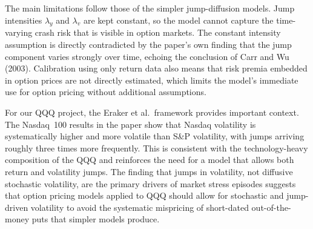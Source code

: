 \documentclass[12pt]{article}
\begin{document}
The main limitations follow those of the simpler jump-diffusion models. Jump
intensities $\lambda_y$ and $\lambda_v$ are kept constant, so the model cannot
capture the time-varying crash risk that is visible in option markets. The constant
intensity assumption is directly contradicted by the paper's own finding that the
jump component varies strongly over time, echoing the conclusion of Carr and Wu
(2003). Calibration using only return data also means that risk premia embedded
in option prices are not directly estimated, which limits the model's immediate
use for option pricing without additional assumptions.

For our QQQ project, the Eraker et al.\ framework provides important context.
The Nasdaq~100 results in the paper show that Nasdaq volatility is systematically
higher and more volatile than S\&P volatility, with jumps arriving roughly three
times more frequently. This is consistent with the technology-heavy composition
of the QQQ and reinforces the need for a model that allows both return and
volatility jumps. The finding that jumps in volatility, not diffusive stochastic
volatility, are the primary drivers of market stress episodes suggests that option
pricing models applied to QQQ should allow for stochastic and jump-driven
volatility to avoid the systematic mispricing of short-dated out-of-the-money
puts that simpler models produce.
\end{document}
